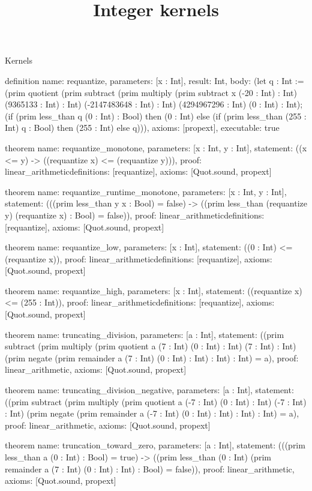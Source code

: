 \begin{lexlean}{Kernels}
\title{Integer kernels}
\begin{semanticmodule}
definition{
  name: requantize,
  parameters: [x : Int],
  result: Int,
  body: (let q : Int := (prim quotient (prim subtract (prim multiply (prim subtract x (-20 : Int) : Int) (9365133 : Int) : Int) (-2147483648 : Int) : Int) (4294967296 : Int) (0 : Int) : Int); (if (prim less_than q (0 : Int) : Bool) then (0 : Int) else (if (prim less_than (255 : Int) q : Bool) then (255 : Int) else q))),
  axioms: [propext],
  executable: true
}

theorem{
  name: requantize_monotone,
  parameters: [x : Int, y : Int],
  statement: ((x <= y) -> ((requantize x) <= (requantize y))),
  proof: linear_arithmetic{definitions: [requantize]},
  axioms: [Quot.sound, propext]
}

theorem{
  name: requantize_runtime_monotone,
  parameters: [x : Int, y : Int],
  statement: (((prim less_than y x : Bool) = false) -> ((prim less_than (requantize y) (requantize x) : Bool) = false)),
  proof: linear_arithmetic{definitions: [requantize]},
  axioms: [Quot.sound, propext]
}

theorem{
  name: requantize_low,
  parameters: [x : Int],
  statement: ((0 : Int) <= (requantize x)),
  proof: linear_arithmetic{definitions: [requantize]},
  axioms: [Quot.sound, propext]
}

theorem{
  name: requantize_high,
  parameters: [x : Int],
  statement: ((requantize x) <= (255 : Int)),
  proof: linear_arithmetic{definitions: [requantize]},
  axioms: [Quot.sound, propext]
}

theorem{
  name: truncating_division,
  parameters: [a : Int],
  statement: ((prim subtract (prim multiply (prim quotient a (7 : Int) (0 : Int) : Int) (7 : Int) : Int) (prim negate (prim remainder a (7 : Int) (0 : Int) : Int) : Int) : Int) = a),
  proof: linear_arithmetic{},
  axioms: [Quot.sound, propext]
}

theorem{
  name: truncating_division_negative,
  parameters: [a : Int],
  statement: ((prim subtract (prim multiply (prim quotient a (-7 : Int) (0 : Int) : Int) (-7 : Int) : Int) (prim negate (prim remainder a (-7 : Int) (0 : Int) : Int) : Int) : Int) = a),
  proof: linear_arithmetic{},
  axioms: [Quot.sound, propext]
}

theorem{
  name: truncation_toward_zero,
  parameters: [a : Int],
  statement: (((prim less_than a (0 : Int) : Bool) = true) -> ((prim less_than (0 : Int) (prim remainder a (7 : Int) (0 : Int) : Int) : Bool) = false)),
  proof: linear_arithmetic{},
  axioms: [Quot.sound, propext]
}


\end{semanticmodule}
\end{lexlean}
